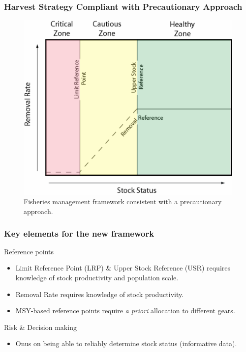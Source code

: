 %
\begin{frame}
	\frametitle{Harvest Strategy Compliant with Precautionary Approach} 
	\begin{figure}
		[htbp] \centering 
		\includegraphics[width=0.7
		\textwidth]{SSF} \caption{Fisheries management framework consistent with a precautionary approach.} \label{fig:SSF} 
	\end{figure}
\end{frame}

%
\begin{frame}[allowframebreaks]
	\frametitle{Key elements for the new framework} 
	\begin{block}
		{Reference points} 
		\begin{itemize}
			\item Limit Reference Point (LRP) \& Upper Stock Reference (USR) requires knowledge of stock productivity and population scale. 
			\item Removal Rate requires knowledge of stock productivity. 
			\item MSY-based reference points require \textit{a priori} allocation to different gears. 
		\end{itemize}
	\end{block}
	\begin{block}
		{Risk \& Decision making} 
		\begin{itemize}
			\item Onus on being able to reliably determine stock status (informative data). 
		\end{itemize}
	\end{block}
\end{frame}

